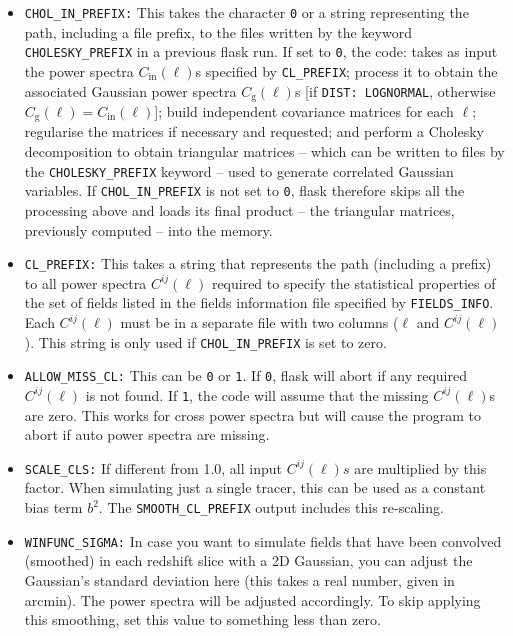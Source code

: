 \documentclass[12pt]{book} %
\newcommand{\nv}[1]{\mathrm{#1}}                 %
\begin{document}
\begin{itemize}
\item {\tt CHOL\_IN\_PREFIX:} This takes the character {\tt 0} or a string representing the path, including 
  a file prefix, to the files written by the keyword {\tt CHOLESKY\_PREFIX} in a previous {\sc flask} run. If set to 
  {\tt 0}, the code: takes as input the power spectra $C_{\nv{in}}(\ell)$s specified by {\tt CL\_PREFIX}; 
  process it to obtain the associated Gaussian power spectra $C_{\nv{g}}(\ell)$s [if {\tt DIST: LOGNORMAL}, 
  otherwise $C_{\nv{g}}(\ell)=C_{\nv{in}}(\ell)$]; build independent covariance matrices for each $\ell$; 
  regularise the matrices if necessary and requested; and perform a Cholesky decomposition to obtain 
  triangular matrices -- which can be written to files by the {\tt CHOLESKY\_PREFIX} keyword -- used 
  to generate correlated Gaussian variables. If {\tt CHOL\_IN\_PREFIX} is not set to {\tt 0}, {\sc flask} 
  therefore skips all the processing above and loads its final product -- the triangular matrices, previously
  computed -- into the memory.

\item {\tt CL\_PREFIX:} This takes a string that represents the path (including a prefix) to all 
  power spectra $C^{ij}(\ell)$ required to specify the statistical properties of the set of fields 
  listed in the fields information file specified by {\tt FIELDS\_INFO}. Each $C^{ij}(\ell)$ must 
  be in a separate file with two columns ($\ell$ and $C^{ij}(\ell)$). This string is only used 
  if {\tt CHOL\_IN\_PREFIX} is set to zero.

\item {\tt ALLOW\_MISS\_CL:} This can be {\tt 0} or {\tt 1}. If {\tt 0}, {\sc flask} will abort 
  if any required $C^{ij}(\ell)$ is not found. If {\tt 1}, the code will assume that the missing 
  $C^{ij}(\ell)$s are zero. This works for cross power spectra but will cause the program to abort 
  if auto power spectra are missing.

\item {\tt SCALE\_CLS:} If different from 1.0, all input $C^{ij}(\ell)s$ are multiplied by 
  this factor. When simulating just a single tracer, this can be used as a constant bias term 
  $b^2$. The {\tt SMOOTH\_CL\_PREFIX} output includes this re-scaling.

\item {\tt WINFUNC\_SIGMA:} In case you want to simulate fields that have been convolved 
  (smoothed) in each redshift slice with a 2D Gaussian, you can adjust the Gaussian's standard 
  deviation here (this takes a real number, given in arcmin). The power spectra will be adjusted accordingly. 
  To skip applying this smoothing, set this value to something less than zero.


\end{itemize}
\end{document}
